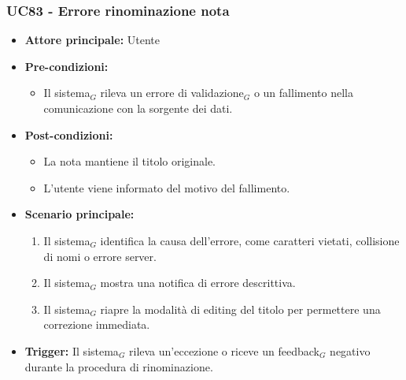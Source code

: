 \documentclass[a4paper, 10pt]{article}
\begin{document}
\subsubsection{UC83 - Errore rinominazione nota}
\hypertarget{uc:83}{}
\begin{itemize}
    \item \textbf{Attore principale:} Utente
    \item \textbf{Pre-condizioni:} 
        \begin{itemize}
            \item Il sistema$_G$ rileva un errore di validazione$_G$ o un fallimento nella comunicazione con la sorgente dei dati.
        \end{itemize}
    \item \textbf{Post-condizioni:} 
        \begin{itemize}
            \item La nota mantiene il titolo originale.
            \item L'utente viene informato del motivo del fallimento.
        \end{itemize}
    \item \textbf{Scenario principale:}
        \begin{enumerate}
            \item Il sistema$_G$ identifica la causa dell'errore, come caratteri vietati, collisione di nomi o errore server.
            \item Il sistema$_G$ mostra una notifica di errore descrittiva.
            \item Il sistema$_G$ riapre la modalità di editing del titolo per permettere una correzione immediata.
        \end{enumerate}
    \item \textbf{Trigger:} Il sistema$_G$ rileva un'eccezione o riceve un feedback$_G$ negativo durante la procedura di rinominazione.
\end{itemize}
\end{document}
